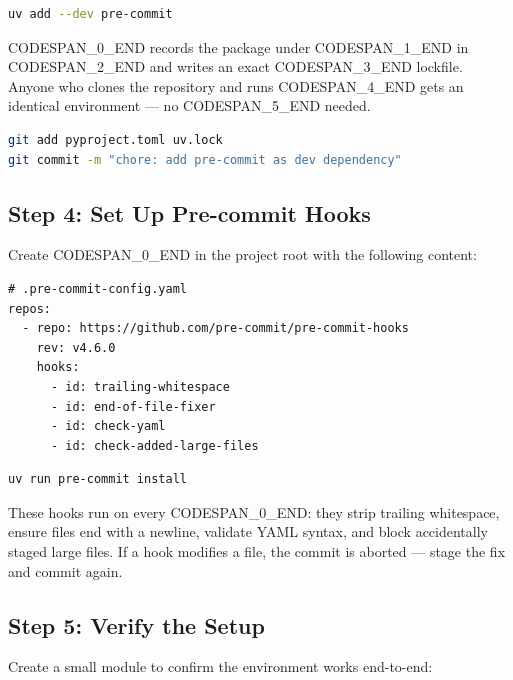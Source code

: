 \documentclass[11pt,a4paper]{book}
\begin{document}
\begin{lstlisting}[language=Bash]
uv add --dev pre-commit
\end{lstlisting}

CODESPAN\_0\_END records the package under CODESPAN\_1\_END in CODESPAN\_2\_END and writes an exact CODESPAN\_3\_END lockfile. Anyone who clones the repository and runs CODESPAN\_4\_END gets an identical environment --- no CODESPAN\_5\_END needed.

\begin{lstlisting}[language=Bash]
git add pyproject.toml uv.lock
git commit -m "chore: add pre-commit as dev dependency"
\end{lstlisting}

\medskip

\subsection{Step 4: Set Up Pre-commit Hooks}

Create CODESPAN\_0\_END in the project root with the following content:

\begin{lstlisting}
# .pre-commit-config.yaml
repos:
  - repo: https://github.com/pre-commit/pre-commit-hooks
    rev: v4.6.0
    hooks:
      - id: trailing-whitespace
      - id: end-of-file-fixer
      - id: check-yaml
      - id: check-added-large-files
\end{lstlisting}

\begin{lstlisting}[language=Bash]
uv run pre-commit install
\end{lstlisting}

These hooks run on every CODESPAN\_0\_END: they strip trailing whitespace, ensure files end with a newline, validate YAML syntax, and block accidentally staged large files. If a hook modifies a file, the commit is aborted --- stage the fix and commit again.

\medskip

\subsection{Step 5: Verify the Setup}

Create a small module to confirm the environment works end-to-end:
\end{document}
